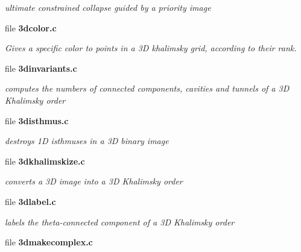 \begin{DoxyCompactItemize}
\begin{DoxyCompactList}\small\item\em ultimate constrained collapse guided by a priority image \item\end{DoxyCompactList}

\item 
file {\bf 3dcolor.c}


\begin{DoxyCompactList}\small\item\em Gives a specific color to points in a 3D khalimsky grid, according to their rank. \item\end{DoxyCompactList}

\item 
file {\bf 3dinvariants.c}


\begin{DoxyCompactList}\small\item\em computes the numbers of connected components, cavities and tunnels of a 3D Khalimsky order \item\end{DoxyCompactList}

\item 
file {\bf 3disthmus.c}


\begin{DoxyCompactList}\small\item\em destroys 1D isthmuses in a 3D binary image \item\end{DoxyCompactList}

\item 
file {\bf 3dkhalimskize.c}


\begin{DoxyCompactList}\small\item\em converts a 3D image into a 3D Khalimsky order \item\end{DoxyCompactList}

\item 
file {\bf 3dlabel.c}


\begin{DoxyCompactList}\small\item\em labels the theta-\/connected component of a 3D Khalimsky order \item\end{DoxyCompactList}

\item 
file {\bf 3dmakecomplex.c}



\end{DoxyCompactItemize}
